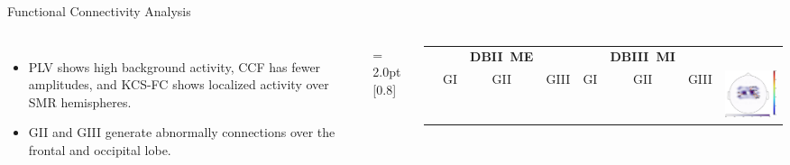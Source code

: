 \documentclass[aspectratio=169]{beamer}
\begin{document}
\begin{frame}{Functional Connectivity Analysis}
    \begin{columns}
            \begin{itemize}
                \item PLV shows high background activity, CCF has fewer amplitudes, and KCS-FC shows localized activity over SMR hemispheres.
                \item GII and GIII generate abnormally connections over the frontal and occipital lobe. 
            \end{itemize}
            \def \kerrwidth {0.15\linewidth}
            \tabcolsep = 2.0pt
            \def\arraystretch{1.0}
            \scalebox{0.8}[0.8]{
                \begin{tabular}{cccccccc}
                    \centering
                    & & \textbf{DBII~ME}& & & \textbf{DBIII~MI}&\\
                    \cmidrule{2-7}
                    & {GI} & {GII}&{GIII}&{GI} & {GII}&{GIII}&
                    \multirow{6}{*}{{\includegraphics[trim=660 0 0 0, clip,scale=0.35]{../Tesis_document/Figures/Objective_1/Cxsbj1hg-gaussacc95.28.eps}}}\\

\end{tabular}}
\end{columns}
\end{frame}
\end{document}

